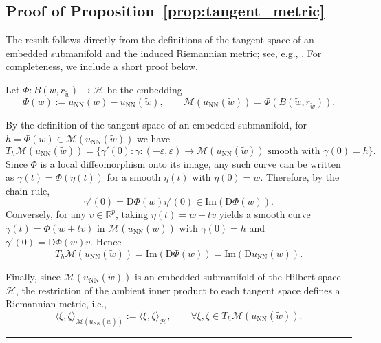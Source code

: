 \documentclass[twoside,11pt]{article}
\newcommand{\BlackBoxProof}{\rule{1.5ex}{1.5ex}}
\renewenvironment{proof}{\par\noindent{\bf Proof\ }}{\hfill\BlackBoxProof\par\medskip}
\newcommand{\D}{\mathrm{D}}
\newcommand{\NN}{\mathrm{NN}}
\begin{document}
\subsection{Proof of Proposition~\ref{prop:tangent_metric}}\label{app:proof-tangent}
\begin{proof}
The result follows directly from the definitions of the tangent space of an embedded submanifold and the induced Riemannian metric; see, e.g., \citep[Chapter~3]{absil2008optimization}. For completeness, we include a short proof below.

Let $\Phi:B(\tilde w,r_{\tilde w})\to\mathcal H$ be the embedding
\[
\Phi(w):=u_\NN(w)-u_\NN(\tilde w),
\qquad \mathcal M(u_\NN(\tilde w))=\Phi(B(\tilde w,r_{\tilde w})).
\]

By the definition of the tangent space of an embedded submanifold,
for $h=\Phi(w)\in\mathcal M(u_\NN(\tilde w))$ we have
\[
T_h\mathcal M(u_\NN(\tilde w))
=\Big\{\gamma'(0) : \gamma:(-\varepsilon,\varepsilon)\to \mathcal M(u_\NN(\tilde w))
\text{ smooth with }\gamma(0)=h\Big\}.
\]
Since $\Phi$ is a local diffeomorphism onto its image, any such curve can be written as
$\gamma(t)=\Phi(\eta(t))$ for a smooth $\eta(t)$ with $\eta(0)=w$.
Therefore, by the chain rule,
\[
\gamma'(0)=\D \Phi(w) \eta'(0)\in \mathrm{Im}(\D \Phi(w)).
\]
Conversely, for any $v\in\mathbb R^p$, taking $\eta(t)=w+tv$ yields a smooth curve
$\gamma(t)=\Phi(w+tv)$ in $\mathcal M(u_\NN(\tilde w))$ with $\gamma(0)=h$ and
$\gamma'(0)=\D\Phi(w)v$. Hence
\[
T_h\mathcal M(u_\NN(\tilde w))=\mathrm{Im}(\D\Phi(w)) =\mathrm{Im}(\D u_\NN (w)).
\]

Finally, since $\mathcal M(u_\NN(\tilde w))$ is an embedded submanifold of the Hilbert space
$\mathcal H$, the restriction of the ambient inner product to each tangent space defines a
Riemannian metric, i.e.,
\[
\langle \xi,\zeta\rangle_{\mathcal M(u_\NN(\tilde w))}:=\langle \xi,\zeta\rangle_{\mathcal H},
\qquad \forall \xi,\zeta\in T_h\mathcal M(u_\NN(\tilde w)).
\]
\end{proof}
\end{document}
